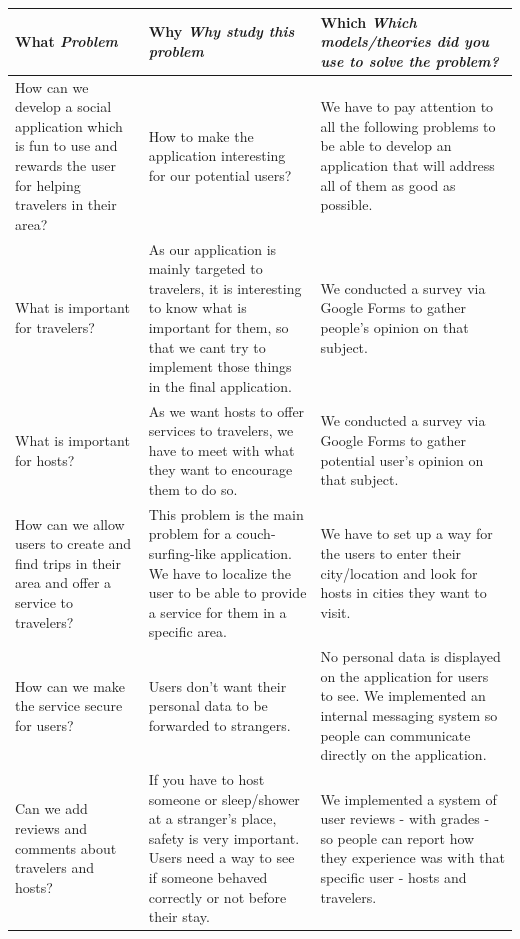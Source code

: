 \documentclass[paper=a4, fontsize=12pt,DIV=14]{scrartcl}    %
\begin{document}
	        \begin{tabular}{|p{5cm}|p{5cm}|p{5.1cm}|}
	            \hline
                \textbf{What} \newline \textit{Problem} & \textbf{Why} \newline \textit{Why study this problem} & \textbf{Which} \newline \textit{Which models/theories did you use to solve the problem?}\\
                \hline
                \hline
                How can we develop a social application which is fun to use and rewards the user for helping travelers in their area? 
                & How to make the application interesting for our potential users?
                & We have to pay attention to all the following problems to be able to develop an application that will address all of them as good as possible.\\
                \hline
                What is important for travelers?
                & As our application is mainly targeted to travelers, it is interesting to know what is important for them, so that we cant try to implement those things in the final application.
                & We conducted a survey via Google Forms to gather people's opinion on that subject.\\
                \hline
                What is important for hosts?
                & As we want hosts to offer services to travelers, we have to meet with what they want to encourage them to do so.
                & We conducted a survey via Google Forms to gather potential user's opinion on that subject.\\
                \hline
                How can we allow users to create and find trips in their area and offer a service to travelers?
                & This problem is the main problem for a couch-surfing-like application. We have to localize the user to be able to provide a service for them in a specific area.
                & We have to set up a way for the users to enter their city/location and look for hosts in cities they want to visit.\\
                \hline
                How can we make the service secure for users?
                & Users don't want their personal data to be forwarded to strangers.
                & No personal data is displayed on the application for users to see. We implemented an internal messaging system so people can communicate directly on the application.\\
                \hline
                Can we add reviews and comments about travelers and hosts?
                & If you have to host someone or sleep/shower at a stranger's place, safety is very important. Users need a way to see if someone behaved correctly or not before their stay.
                & We implemented a system of user reviews - with grades - so people can report how they experience was with that specific user - hosts and travelers.\\
                \hline
            \end{tabular}
\end{document}

